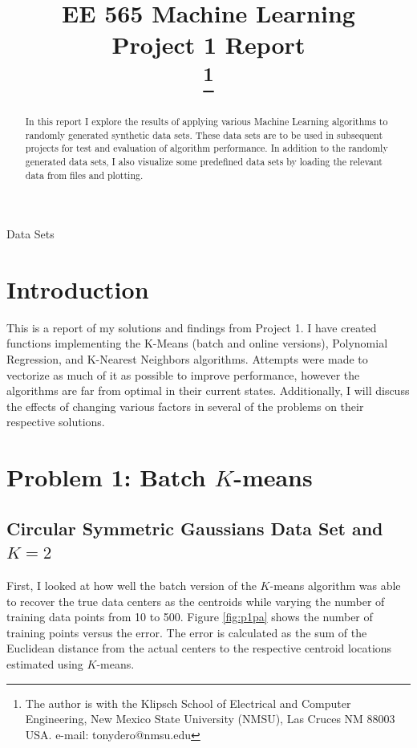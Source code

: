 \documentclass[conference]{IEEEtran}
\begin{document}
\title{EE 565 Machine Learning\\
Project 1 Report\\
\thanks{The author is with the Klipsch School of Electrical and Computer Engineering, New Mexico State University (NMSU), Las Cruces NM 88003 USA. e-mail: tonydero@nmsu.edu}
}

\author{}

\maketitle

\begin{abstract}

In this report I explore the results of applying various Machine Learning algorithms to randomly generated synthetic data sets. These data sets are to be used in subsequent projects for test and evaluation of algorithm performance. In addition to the randomly generated data sets, I also visualize some predefined data sets by loading the relevant data from files and plotting.

\end{abstract}

\begin{IEEEkeywords}
	Data Sets
\end{IEEEkeywords}

\section{Introduction}

This is a report of my solutions and findings from Project 1. I have created functions implementing the K-Means (batch and online versions), Polynomial Regression, and K-Nearest Neighbors algorithms. Attempts were made to vectorize as much of it as possible to improve performance, however the algorithms are far from optimal in their current states. Additionally, I will discuss the effects of changing various factors in several of the problems on their respective solutions.

\section{Problem 1: Batch $K$-means}
\subsection{Circular Symmetric Gaussians Data Set and $K=2$}
First, I looked at how well the batch version of the $K$-means algorithm was able to recover the true data centers as the centroids while varying the number of training data points from 10 to 500. Figure \ref{fig:p1pa} shows the number of training points versus the error. The error is calculated as the sum of the Euclidean distance from the actual centers to the respective centroid locations estimated using $K$-means.
\end{document}
